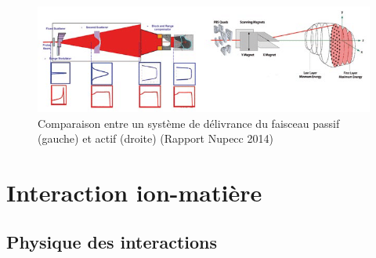 \documentclass[11pt,a4paper,oldfontcommands]{memoir}
\begin{document}
\begin{figure}[h!]
    \centering
    \includegraphics [scale = 0.7]{intro/Passive-left-and-active-right-beam-delivery-system-courtesy-of-IBA.png}
    \caption{Comparaison entre un système de délivrance du faisceau passif (gauche) et actif (droite) (Rapport Nupecc 2014)}
    \label{fig:my_label}
\end{figure}
\openany
\section{Interaction ion-matière}
\subsection{Physique des interactions}
\end{document}
